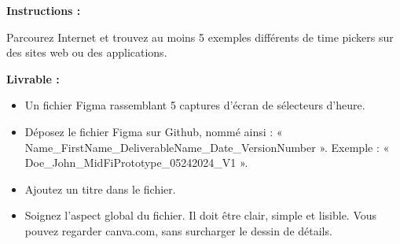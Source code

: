 \makeheaderfiles

\textbf{Instructions :}

Parcourez Internet et trouvez au moins 5 exemples différents de time pickers sur des sites web ou des applications.

\textbf{Livrable :}

\begin{itemize}
\item Un fichier Figma rassemblant 5 captures d'écran de sélecteurs d'heure.
\item Déposez le fichier Figma sur Github, nommé ainsi : « Name\_FirstName\_DeliverableName\_Date\_VersionNumber ». Exemple : « Doe\_John\_MidFiPrototype\_05242024\_V1 ».
\item Ajoutez un titre dans le fichier.
\item Soignez l'aspect global du fichier. Il doit être clair, simple et lisible. Vous pouvez regarder canva.com, sans surcharger le dessin de détails.
\end{itemize}


